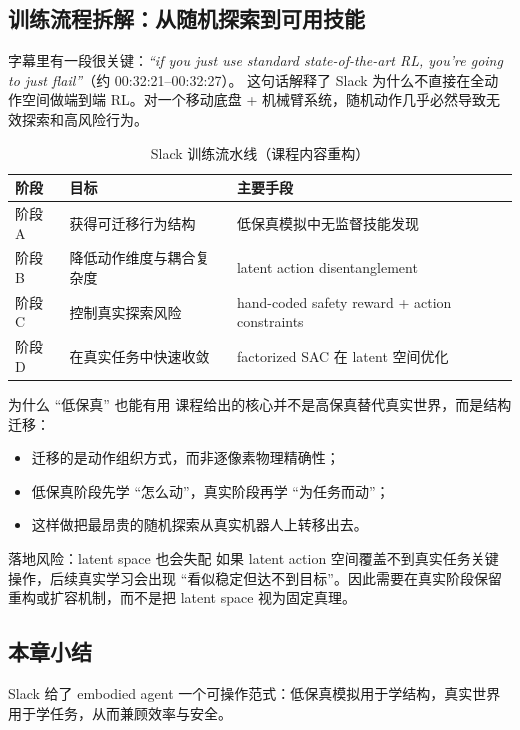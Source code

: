 \documentclass[a4paper]{article}
\begin{document}
\subsection{训练流程拆解：从随机探索到可用技能}
字幕里有一段很关键：\textit{``if you just use standard state-of-the-art RL, you're going to just flail''}（约 00:32:21--00:32:27）。
这句话解释了 Slack 为什么不直接在全动作空间做端到端 RL。对一个移动底盘 + 机械臂系统，随机动作几乎必然导致无效探索和高风险行为。

\begin{table}[H]
\centering
\begin{tabular}{p{2.2cm}p{4.8cm}p{4.8cm}}
\toprule
\textbf{阶段} & \textbf{目标} & \textbf{主要手段} \\
\midrule
阶段 A & 获得可迁移行为结构 & 低保真模拟中无监督技能发现 \\
阶段 B & 降低动作维度与耦合复杂度 & latent action disentanglement \\
阶段 C & 控制真实探索风险 & hand-coded safety reward + action constraints \\
阶段 D & 在真实任务中快速收敛 & factorized SAC 在 latent 空间优化 \\
\bottomrule
\end{tabular}
\caption{Slack 训练流水线（课程内容重构）}
\end{table}

\begin{knowledgebox}{为什么 ``低保真'' 也能有用}
课程给出的核心并不是高保真替代真实世界，而是结构迁移：
\begin{itemize}
    \item 迁移的是动作组织方式，而非逐像素物理精确性；
    \item 低保真阶段先学 ``怎么动''，真实阶段再学 ``为任务而动''；
    \item 这样做把最昂贵的随机探索从真实机器人上转移出去。
\end{itemize}
\end{knowledgebox}

\begin{warningbox}{落地风险：latent space 也会失配}
如果 latent action 空间覆盖不到真实任务关键操作，后续真实学习会出现 ``看似稳定但达不到目标''。因此需要在真实阶段保留重构或扩容机制，而不是把 latent space 视为固定真理。
\end{warningbox}

\subsection{本章小结}
Slack 给了 embodied agent 一个可操作范式：低保真模拟用于学结构，真实世界用于学任务，从而兼顾效率与安全。
\end{document}
